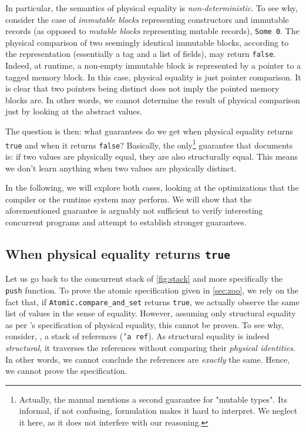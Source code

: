 In particular, the semantics of physical equality is \emph{non-deterministic}.
To see why, consider the case of \emph{immutable blocks} representing constructors and immutable records (as opposed to \emph{mutable blocks} representing mutable records), \eg \texttt{Some 0}.
The physical comparison of two seemingly identical immutable blocks, according to the \Rocq representation (essentially a tag and a list of fields), may return \texttt{false}.
Indeed, at runtime, a non-empty immutable block is represented by a pointer to a tagged memory block.
In this case, physical equality is just pointer comparison.
It is clear that two pointers being distinct does not imply the pointed memory blocks are.
In other words, we cannot determine the result of physical comparison just by looking at the abstract values.

The question is then: what guarantees do we get when physical equality returns \texttt{true} and when it returns \texttt{false}?
Basically, the only\footnote{Actually, the \OCaml manual mentions a second guarantee for "mutable types". Its informal, if not confusing, formulation makes it hard to interpret. We neglect it here, as it does not interfere with our reasoning.} guarantee that \OCaml documents is: if two values are physically equal, they are also structurally equal.
This means we don't learn anything when two values are physically distinct.

In the following, we will explore both cases, looking at the optimizations that the compiler or the runtime system may perform.
We will show that the aforementioned guarantee is arguably not sufficient to verify interesting concurrent programs and attempt to establish stronger guarantees.

\subsection{When physical equality returns \texttt{true}}

Let us go back to the concurrent stack of \cref{fig:stack} and more specifically the \texttt{push} function.
To prove the atomic specification given in \cref{sec:zoo}, we rely on the fact that, if \texttt{Atomic.compare_and_set} returns \texttt{true}, we actually observe the same list of values in the sense of \Rocq equality.
However, assuming only structural equality as per \OCaml's specification of physical equality, this cannot be proven.
To see why, consider, \eg, a stack of references (\texttt{'a ref}).
As structural equality is indeed \emph{structural}, it traverses the references without comparing their \emph{physical identities}.
In other words, we cannot conclude the references are \emph{exactly} the same.
Hence, we cannot prove the specification.

